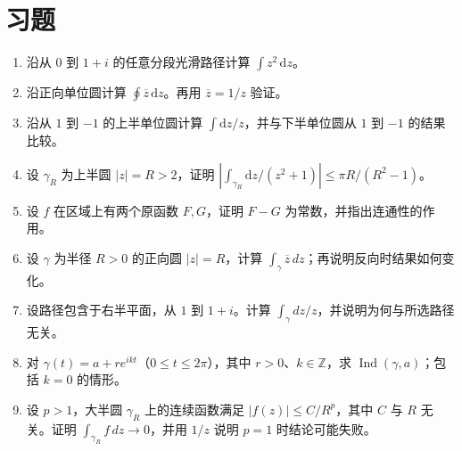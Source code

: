 \section{习题}
\label{sec:ca-integral-ex}
\begin{enumerate}
 \item 沿从 $0$ 到 $1+i$ 的任意分段光滑路径计算 $\int z^2\,\mathrm dz$。
 \item 沿正向单位圆计算 $\oint\overline z\,\mathrm dz$。再用 $\overline z=1/z$ 验证。
 \item 沿从 $1$ 到 $-1$ 的上半单位圆计算 $\int\mathrm dz/z$，并与下半单位圆从 $1$ 到 $-1$ 的结果比较。
 \item 设 $\gamma_R$ 为上半圆 $|z|=R>2$，证明 $\left|\int_{\gamma_R}\mathrm dz/(z^2+1)\right|\le\pi R/(R^2-1)$。
 \item 设 $f$ 在区域上有两个原函数 $F,G$，证明 $F-G$ 为常数，并指出连通性的作用。

  \item\label{ex:ca-circle-conjugate} 设 $\gamma$ 为半径 $R>0$ 的正向圆 $|z|=R$，计算 $\int_\gamma\overline z\,dz$；再说明反向时结果如何变化。
  \item\label{ex:ca-log-integral} 设路径包含于右半平面，从 $1$ 到 $1+i$。计算 $\int_\gamma dz/z$，并说明为何与所选路径无关。
  \item\label{ex:ca-winding-path} 对 $\gamma(t)=a+re^{ikt}$（$0\le t\le2\pi$），其中 $r>0$、$k\in\mathbb{Z}$，求 $\operatorname{Ind}(\gamma,a)$；包括 $k=0$ 的情形。
  \item\label{ex:ca-arc-estimate} 设 $p>1$，大半圆 $\gamma_R$ 上的连续函数满足 $|f(z)|\le C/R^p$，其中 $C$ 与 $R$ 无关。证明 $\int_{\gamma_R}f\,dz\to0$，并用 $1/z$ 说明 $p=1$ 时结论可能失败。
\end{enumerate}

